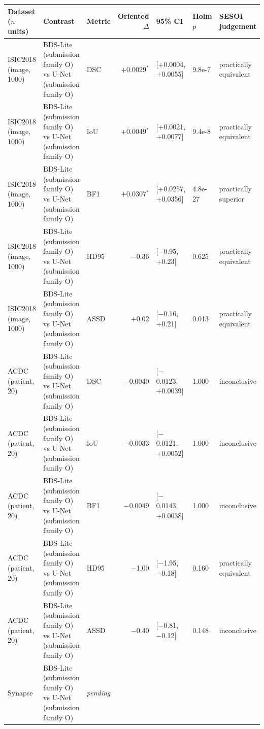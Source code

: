 \begin{tabular}{lllrlll}
\toprule
Dataset ($n$ units) & Contrast & Metric & Oriented $\Delta$ & 95\% CI & Holm $p$ & SESOI judgement \\
\midrule
ISIC2018 (image, 1000) & BDS-Lite (submission family O) vs U-Net (submission family O) & DSC & +0.0029$^{*}$ & [+0.0004, +0.0055] & 9.8e-7 & practically equivalent \\
ISIC2018 (image, 1000) & BDS-Lite (submission family O) vs U-Net (submission family O) & IoU & +0.0049$^{*}$ & [+0.0021, +0.0077] & 9.4e-8 & practically equivalent \\
ISIC2018 (image, 1000) & BDS-Lite (submission family O) vs U-Net (submission family O) & BF1 & +0.0307$^{*}$ & [+0.0257, +0.0356] & 4.8e-27 & practically superior \\
ISIC2018 (image, 1000) & BDS-Lite (submission family O) vs U-Net (submission family O) & HD95 & $-$0.36 & [$-$0.95, +0.23] & 0.625 & practically equivalent \\
ISIC2018 (image, 1000) & BDS-Lite (submission family O) vs U-Net (submission family O) & ASSD & +0.02 & [$-$0.16, +0.21] & 0.013 & practically equivalent \\
\midrule
ACDC (patient, 20) & BDS-Lite (submission family O) vs U-Net (submission family O) & DSC & $-$0.0040 & [$-$0.0123, +0.0039] & 1.000 & inconclusive \\
ACDC (patient, 20) & BDS-Lite (submission family O) vs U-Net (submission family O) & IoU & $-$0.0033 & [$-$0.0121, +0.0052] & 1.000 & inconclusive \\
ACDC (patient, 20) & BDS-Lite (submission family O) vs U-Net (submission family O) & BF1 & $-$0.0049 & [$-$0.0143, +0.0038] & 1.000 & inconclusive \\
ACDC (patient, 20) & BDS-Lite (submission family O) vs U-Net (submission family O) & HD95 & $-$1.00 & [$-$1.95, $-$0.18] & 0.160 & practically equivalent \\
ACDC (patient, 20) & BDS-Lite (submission family O) vs U-Net (submission family O) & ASSD & $-$0.40 & [$-$0.81, $-$0.12] & 0.148 & inconclusive \\
\midrule
Synapse & BDS-Lite (submission family O) vs U-Net (submission family O) & \multicolumn{5}{l}{\textit{pending}} \\
\bottomrule
\end{tabular}
